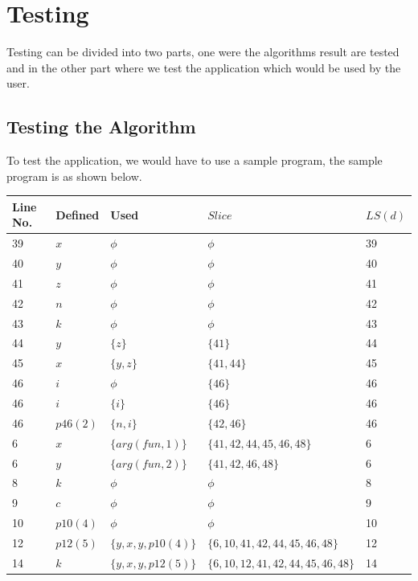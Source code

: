 \documentclass[conference]{IEEEtran}
\begin{document}
\section{Testing}
Testing can be divided into two parts, one were the algorithms result are tested and in the other part where we test the application which would be used by the user.
\subsection{Testing the Algorithm}
To test the application, we would have to use a sample program, the sample program is as shown below.
\begin{table}[t]
    \centering
    \begin{tabular}{| p{} | p{} | p{} |p{} |p{} |}
        \hline
        \textbf{Line No.}&\textbf{Defined}&\textbf{Used}&$Slice$&$LS(d)$\\\hline
    39 & $x$ & $\phi$ & $\phi$ & 39 \\\hline
40 & $y$ & $\phi$ & $\phi$ & 40 \\\hline
41 & $z$ & $\phi$ & $\phi$ & 41 \\\hline
42 & $n$ & $\phi$ & $\phi$ & 42 \\\hline
43 & $k$ & $\phi$ & $\phi$ & 43 \\\hline
44 & $y$ & $\{z\}$ & $\{41\}$ & 44 \\\hline
45 & $x$ & $\{y , z\}$ & $\{41 , 44\}$ & 45 \\\hline
46 & $i$ & $\phi$ & $\{46\}$ & 46 \\\hline
46 & $i$ & $\{i\}$ & $\{46\}$ & 46 \\\hline
46 & $p46(2)$ & $\{n , i\}$ & $\{42 , 46\}$ & 46 \\\hline
6 & $x$ & $\{arg(fun,1)\}$ & $\{41 , 42 , 44 , 45 , 46 , 48\}$ & 6 \\\hline
6 & $y$ & $\{arg(fun,2)\}$ & $\{41 , 42 , 46 , 48\}$ & 6 \\\hline
8 & $k$ & $\phi$ & $\phi$ & 8 \\\hline
9 & $c$ & $\phi$ & $\phi$ & 9 \\\hline
10 & $p10(4)$ & $\phi$ & $\phi$ & 10 \\\hline
12 & $p12(5)$ & $\{y , x , y , p10(4)\}$ & $\{6 , 10 , 41 , 42 , 44 , 45 , 46 , 48\}$ & 12 \\\hline
14 & $k$ & $\{y , x , y , p12(5)\}$ & $\{6 , 10 , 12 , 41 , 42 , 44 , 45 , 46 , 48\}$ & 14 \\\hline

\end{tabular}
\end{table}
\end{document}
